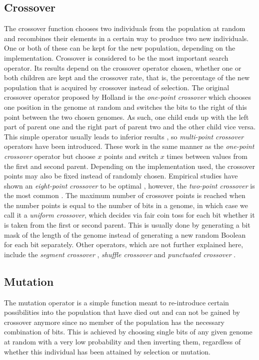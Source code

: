 \subsection{Crossover}
\label{sec:crossover}

The crossover function chooses two individuals from the population at random and recombines their elements in a certain way to produce two new individuals. One or both of these can be kept for the new population, depending on the implementation. Crossover is considered to be the most important search operator\cite{16}. Its results depend on the crossover operator chosen, whether one or both children are kept and the crossover rate, that is, the percentage of the new population that is acquired by crossover instead of selection. The original crossover operator proposed by Holland is the \textit{one-point crossover} which chooses one position in the genome at random and switches the bits to the right of this point between the two chosen genomes. As such, one child ends up with the left part of parent one and the right part of parent two and the other child vice versa. This simple operator usually leads to inferior results \cite{18,19,20}, so \textit{multi-point crossover} operators have been introduced. These work in the same manner as the \textit{one-point crossover} operator but choose $x$ points and switch $x$ times between values from the first and second parent. Depending on the implementation used, the crossover points may also be fixed instead of randomly chosen. Empirical studies have shown an \textit{eight-point crossover} to be optimal \cite{21,22,19}, however, the \textit{two-point crossover} is the most common \cite{19}. The maximum number of crossover points is reached when the number points is equal to the number of bits in a genome, in which case we call it a \textit{uniform crossover}, which decides via fair coin toss for each bit whether it is taken from the first or second parent. This is usually done by generating a bit mask of the length of the genome instead of generating a new random Boolean for each bit separately. Other operators, which are not further explained here, include the \textit{segment crossover} \cite{19}, \textit{shuffle crossover} \cite{19} and \textit{punctuated crossover} \cite{23}.

\subsection{Mutation}
\label{sec:mutation}

The mutation operator is a simple function meant to re-introduce certain possibilities into the population that have died out and can not be gained by crossover anymore since no member of the population has the necessary combination of bits. This is achieved by choosing single bits of any given genome at random with a very low probability and then inverting them, regardless of whether this individual has been attained by selection or mutation.
 
